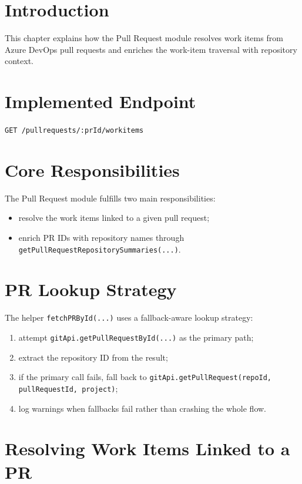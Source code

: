 \documentclass[12pt,a4paper]{report}
\newcommand{\code}[1]{\texttt{\small\color{codered}#1}}
\begin{document}
\section{Introduction}

This chapter explains how the Pull Request module resolves work items from
Azure DevOps pull requests and enriches the work-item traversal with repository
context.

\section{Implemented Endpoint}

\begin{center}
\code{GET /pullrequests/:prId/workitems}
\end{center}

\section{Core Responsibilities}

The Pull Request module fulfills two main responsibilities:

\begin{itemize}
  \item resolve the work items linked to a given pull request;
  \item enrich PR IDs with repository names through \code{getPullRequestRepositorySummaries(...)}.
\end{itemize}

\section{PR Lookup Strategy}

The helper \code{fetchPRById(...)} uses a fallback-aware lookup strategy:

\begin{enumerate}
  \item attempt \code{gitApi.getPullRequestById(...)} as the primary path;
  \item extract the repository ID from the result;
  \item if the primary call fails, fall back to \code{gitApi.getPullRequest(repoId, pullRequestId, project)};
  \item log warnings when fallbacks fail rather than crashing the whole flow.
\end{enumerate}

\section{Resolving Work Items Linked to a PR}
\end{document}
